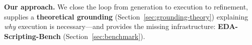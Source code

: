 \textbf{Our approach.} We close the loop from generation to execution to refinement, supplies a \textbf{theoretical grounding} (Section~\ref{sec:grounding-theory}) explaining \emph{why} execution is necessary---and provides the missing infrastructure: \textbf{EDA-Scripting-Bench} (Section~\ref{sec:benchmark}).

